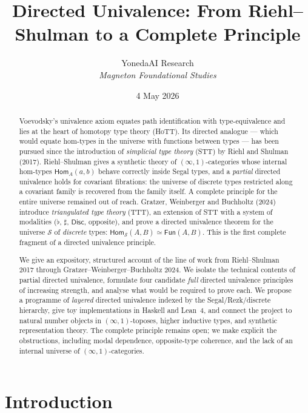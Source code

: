 \documentclass[12pt]{article}
\title{Directed Univalence: From Riehl--Shulman to a Complete Principle}
\author{YonedaAI Research \\
\textit{Magneton Foundational Studies}}
\date{4 May 2026}
\theoremstyle{definition}
\theoremstyle{remark}
\newcommand{\Hom}{\mathsf{Hom}}
\newcommand{\Fun}{\mathsf{Fun}}
\newcommand{\eqv}{\simeq}
\newcommand{\Disc}{\mathsf{Disc}}
\begin{document}
\maketitle

\begin{abstract}
Voevodsky's univalence axiom equates path identification with type-equivalence and lies at the heart of homotopy type theory (HoTT). Its directed analogue --- which would equate hom-types in the universe with functions between types --- has been pursued since the introduction of \emph{simplicial type theory} (STT) by Riehl and Shulman (2017). Riehl--Shulman gives a synthetic theory of $(\infty,1)$-categories whose internal hom-types $\Hom_A(a,b)$ behave correctly inside Segal types, and a \emph{partial} directed univalence holds for covariant fibrations: the universe of discrete types restricted along a covariant family is recovered from the family itself. A complete principle for the entire universe remained out of reach. Gratzer, Weinberger and Buchholtz (2024) introduce \emph{triangulated type theory} (TTT), an extension of STT with a system of modalities ($\flat$, $\sharp$, $\Disc$, opposite), and prove a directed univalence theorem for the universe $\mathcal{S}$ of \emph{discrete} types: $\Hom_{\mathcal{S}}(A,B) \eqv \Fun(A,B)$. This is the first complete fragment of a directed univalence principle.

We give an expository, structured account of the line of work from Riehl--Shulman 2017 through Gratzer--Weinberger--Buchholtz 2024. We isolate the technical contents of partial directed univalence, formulate four candidate \emph{full} directed univalence principles of increasing strength, and analyse what would be required to prove each. We propose a programme of \emph{layered} directed univalence indexed by the Segal/Rezk/discrete hierarchy, give toy implementations in Haskell and Lean~4, and connect the project to natural number objects in $(\infty,1)$-toposes, higher inductive types, and synthetic representation theory. The complete principle remains open; we make explicit the obstructions, including modal dependence, opposite-type coherence, and the lack of an internal universe of $(\infty,1)$-categories.
\end{abstract}

\tableofcontents

\section{Introduction}\label{sec:intro}
\end{document}
